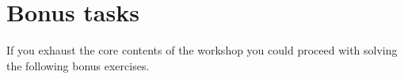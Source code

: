 \section{Bonus tasks}

If you exhaust the core contents of the workshop you could proceed with solving the following bonus exercises.

%
%
%
%
%
%
%


